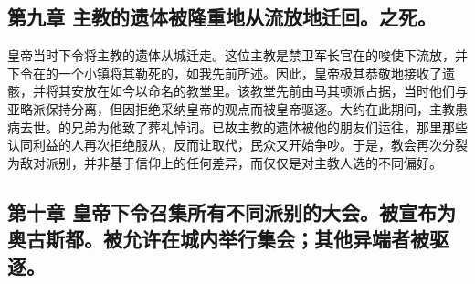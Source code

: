 
\subsection{第九章 主教的遗体被隆重地从流放地迁回。之死。}

皇帝当时下令将主教的遗体从城迁走。这位主教是禁卫军长官在的唆使下流放，并下令在的一个小镇将其勒死的，如我先前所述。因此，皇帝极其恭敬地接收了遗骸，并将其安放在如今以命名的教堂里。该教堂先前由马其顿派占据，当时他们与亚略派保持分离，但因拒绝采纳皇帝的观点而被皇帝驱逐。大约在此期间，主教患病去世。的兄弟为他致了葬礼悼词。已故主教的遗体被他的朋友们运往，那里那些认同利益的人再次拒绝服从，反而让取代，民众又开始争吵。于是，教会再次分裂为敌对派别，并非基于信仰上的任何差异，而仅仅是对主教人选的不同偏好。\par


\subsection{第十章 皇帝下令召集所有不同派别的大会。被宣布为奥古斯都。被允许在城内举行集会；其他异端者被驱逐。}

